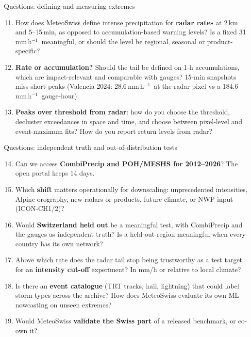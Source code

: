\documentclass[aspectratio=169,10pt]{beamer}
\newcommand{\mmh}{\,mm\,h$^{-1}$}
\begin{document}
\begin{frame}{Questions: defining and measuring extremes}
  \small
  \begin{enumerate}
    \setcounter{enumi}{10}
    \item How does MeteoSwiss define intense precipitation for \textbf{radar rates} at 2\,km
      and 5--15\,min, as opposed to accumulation-based warning levels? Is a fixed 31\mmh\
      meaningful, or should the level be regional, seasonal or product-specific?
    \item \textbf{Rate or accumulation?} Should the tail be defined on 1-h accumulations,
      which are impact-relevant and comparable with gauges? 15-min snapshots miss short peaks
      (Valencia 2024: 28.6\mmh\ at the radar pixel vs a 184.6\mmh\ gauge-hour).
    \item \textbf{Peaks over threshold from radar}: how do you choose the threshold, decluster
      exceedances in space and time, and choose between pixel-level and event-maximum fits?
      How do you report return levels from radar?
  \end{enumerate}
\end{frame}

\begin{frame}{Questions: independent truth and out-of-distribution tests}
  \small
  \begin{enumerate}
    \setcounter{enumi}{13}
    \item Can we access \textbf{CombiPrecip and POH/MESHS for 2012--2026}? The open portal
      keeps 14 days.
    \item Which \textbf{shift} matters operationally for downscaling: unprecedented
      intensities, Alpine orography, new radars or products, future climate, or NWP input
      (ICON-CH1/2)?
    \item Would \textbf{Switzerland held out} be a meaningful test, with CombiPrecip and the
      gauges as independent truth? Is a held-out region meaningful when every country has its
      own network?
    \item Above which rate does the radar tail stop being trustworthy as a test target for
      an \textbf{intensity cut-off} experiment? In mm/h or relative to local climate?
    \item Is there an \textbf{event catalogue} (TRT tracks, hail, lightning) that could label
      storm types across the archive? How does MeteoSwiss evaluate its own ML nowcasting on
      unseen extremes?
    \item Would MeteoSwiss \textbf{validate the Swiss part} of a released benchmark, or
      co-own it?
  \end{enumerate}
\end{frame}
\end{document}
